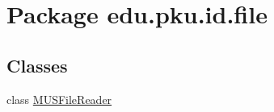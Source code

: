 \hypertarget{namespaceedu_1_1pku_1_1id_1_1file}{
\section{Package edu.pku.id.file}
\label{namespaceedu_1_1pku_1_1id_1_1file}
}
\subsection*{Classes}
\begin{DoxyCompactItemize}
\item 
class \hyperlink{classedu_1_1pku_1_1id_1_1file_1_1_m_u_s_file_reader}{MUSFileReader}
\end{DoxyCompactItemize}
